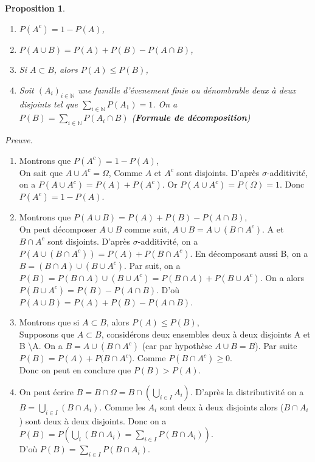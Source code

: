 \documentclass[a4paper, 12pt, french]{report}
\theoremstyle{break}
\newtheorem{prop}[defin]{Proposition}
\begin{document}
\begin{prop}
	\begin{enumerate}
		\item $P(A^{c}) = 1 - P(A)$,
		\item $P(A \cup B) = P(A) + P(B) - P(A \cap B)$,
		\item Si $A \subset B$, alors $P(A) \leq P(B)$,
		\item Soit $(A_{i})_{i \in \mathbb{N}}$ une famille d'évenement finie ou dénombrable deux à deux disjoints tel que $\displaystyle\sum_{i \in \mathbb{N}} P(A_{1}) = 1$. On a\\ $P(B) = \displaystyle\sum_{i \in \mathbb{N}} P(A_{i} \cap B)$ (\textbf{Formule de décomposition})
	\end{enumerate}
\end{prop}
\textit{Preuve.}
\begin{enumerate}
	\item Montrons que $P(A^{c}) = 1 - P(A)$,\\
	On sait que $A \cup A^{c} = \Omega$, Comme $A$ et $A^{c}$ sont disjoints. D'après $\sigma$-additivité, on a $P(A \cup A^{c}) = P(A) + P(A^{c})$. Or $P(A \cup A^{c})=P(\Omega)=1$. Donc $P(A^{c}) = 1 - P(A)$.
	\item Montrons que $P(A \cup B) = P(A) + P(B) - P(A \cap B)$,\\
		On peut décomposer $A \cup B$ comme suit, $A \cup B = A \cup (B \cap A^{c})$. A et $B \cap A^{c}$ sont disjoints. D'après $\sigma$-additivité, on a $P(A \cup (B \cap A^{c})) = P(A) + P(B \cap A^{c})$. En décomposant aussi B, on a $B = (B \cap A) \cup (B \cup A^{c})$. Par suit, on a $P(B) = P(B \cap A) \cup (B \cup A^{c}) = P(B \cap A) + P(B \cup A^{c})$. On a alors $P(B \cup A^{c}) = P(B) - P(A \cap B)$. D'où $P(A \cup B) = P(A) + P(B) - P(A \cap B)$.
    \item Montrons que si $A \subset B$, alors $P(A) \leq P(B)$,\\
     Supposons que $A \subset B$, considérons deux ensembles deux à deux disjoints A et B \textbackslash A. On a $B = A \cup (B \cap A^{c})$ (car par hypothèse $A \cup B = B$). Par suite $P(B) = P(A) + P(B \cap A^{c}$). Comme $P(B \cap A^{c}) \geq 0$. \\Donc on peut en conclure que $P(B)>P(A)$.
     \item On peut écrire $B = B \cap \Omega =  B \cap (\displaystyle\bigcup_{i \in I} A_{i})$. D'après la distributivité on a $\displaystyle B = \bigcup_{i \in I} (B \cap A_{i})$. 
     Comme les $A_{i}$ sont deux à deux disjoints alors ($B \cap A_{i}$) sont deux à deux disjoints. Donc on a $P(B) = P(\displaystyle\bigcup_{i} (B \cap A_{i}) = \displaystyle\sum_{i \in I} P(B \cap A_{i}))$.\\
     D'où $\displaystyle P(B) = \displaystyle\sum_{i \in I} P(B \cap A_{i})$.  \marginpar{$\square$}
\end{enumerate}
\end{document}
